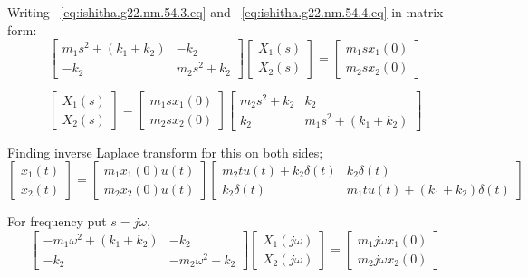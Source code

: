 \documentclass[journal,12pt,twocolumn]{IEEEtran}
\theoremstyle{remark}
\begin{document}
Writing ~\eqref{eq:ishitha.g22.nm.54.3.eq} and ~\eqref{eq:ishitha.g22.nm.54.4.eq} in matrix form:
\[
\begin{bmatrix}
m_1s^2+(k_1+k_2) & -k_2  \\
-k_2& m_2s^2+k_2
\end{bmatrix}
\begin{bmatrix}
X_1(s) \\
X_2(s)
\end{bmatrix}
=
\begin{bmatrix}
m_1sx_1(0) \\
m_2sx_2(0)
\end{bmatrix}
\]

\[
\begin{bmatrix}
X_1(s) \\
X_2(s)
\end{bmatrix}
=
\begin{bmatrix}
m_1sx_1(0) \\
m_2sx_2(0)
\end{bmatrix}
\begin{bmatrix}
m_2s^2+k_2 & k_2  \\
k_2& m_1s^2+(k_1+k_2)
\end{bmatrix}
\]

Finding inverse Laplace transform for this on both sides;
\[
\begin{bmatrix}
x_1(t) \\
x_2(t)
\end{bmatrix}
=
\begin{bmatrix}
m_1x_1(0)u(t) \\
m_2x_2(0)u(t)
\end{bmatrix}
\begin{bmatrix}
m_2tu(t) +k_2 \delta (t)& k_2\delta (t)  \\
k_2\delta (t)& m_1tu(t)+(k_1+k_2)\delta (t)
\end{bmatrix}
\]

For frequency put $s=j\omega$,
\[
\begin{bmatrix}
-m_1\omega ^2+(k_1+k_2) & -k_2  \\
-k_2& -m_2\omega ^2+k_2
\end{bmatrix}
\begin{bmatrix}
X_1(j\omega) \\
X_2(j\omega)
\end{bmatrix}
=
\begin{bmatrix}
m_1 j\omega x_1(0)\\
m_2 j\omega x_2(0)
\end{bmatrix}
\]
\end{document}
